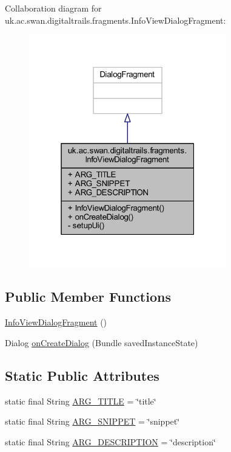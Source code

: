 Collaboration diagram for uk.\+ac.\+swan.\+digitaltrails.\+fragments.\+Info\+View\+Dialog\+Fragment\+:
\nopagebreak
\begin{figure}[H]
\begin{center}
\leavevmode
\includegraphics[width=244pt]{classuk_1_1ac_1_1swan_1_1digitaltrails_1_1fragments_1_1_info_view_dialog_fragment__coll__graph}
\end{center}
\end{figure}
\subsection*{Public Member Functions}
\begin{DoxyCompactItemize}
\item 
\hyperlink{classuk_1_1ac_1_1swan_1_1digitaltrails_1_1fragments_1_1_info_view_dialog_fragment_a72f8ccaadba3a2adc3b19f2f89de8c6f}{Info\+View\+Dialog\+Fragment} ()
\item 
Dialog \hyperlink{classuk_1_1ac_1_1swan_1_1digitaltrails_1_1fragments_1_1_info_view_dialog_fragment_a4a698516f20b8d5b553956766ceca0dd}{on\+Create\+Dialog} (Bundle saved\+Instance\+State)
\end{DoxyCompactItemize}
\subsection*{Static Public Attributes}
\begin{DoxyCompactItemize}
\item 
static final String \hyperlink{classuk_1_1ac_1_1swan_1_1digitaltrails_1_1fragments_1_1_info_view_dialog_fragment_abc5f258510b73a9b73edf43223860fd7}{A\+R\+G\+\_\+\+T\+I\+T\+L\+E} = \char`\"{}title\char`\"{}
\item 
static final String \hyperlink{classuk_1_1ac_1_1swan_1_1digitaltrails_1_1fragments_1_1_info_view_dialog_fragment_a6fda7d7dba66616acccb7827c156a396}{A\+R\+G\+\_\+\+S\+N\+I\+P\+P\+E\+T} = \char`\"{}snippet\char`\"{}
\item 
static final String \hyperlink{classuk_1_1ac_1_1swan_1_1digitaltrails_1_1fragments_1_1_info_view_dialog_fragment_ac293f1004ca9b6d9ad5f33d9a1a951a0}{A\+R\+G\+\_\+\+D\+E\+S\+C\+R\+I\+P\+T\+I\+O\+N} = \char`\"{}description\char`\"{}
\end{DoxyCompactItemize}
